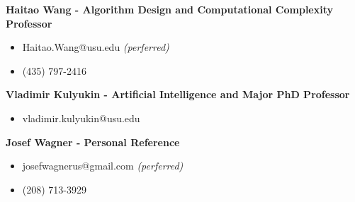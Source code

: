 \documentclass[letterpaper,11pt]{article}
\begin{document}
\textbf{Haitao Wang - Algorithm Design and Computational Complexity Professor}
\begin{itemize}[noitemsep,topsep=0pt]
	\item Haitao.Wang@usu.edu \textit{(perferred)}
	\item (435) 797-2416\\
\end{itemize}

\textbf{Vladimir Kulyukin - Artificial Intelligence and Major PhD Professor}
\begin{itemize}[noitemsep,topsep=0pt]
	\item vladimir.kulyukin@usu.edu\\
\end{itemize}

\textbf{Josef Wagner - Personal Reference}
\begin{itemize}[noitemsep,topsep=0pt]
	\item josefwagnerus@gmail.com \textit{(perferred)}
	\item (208) 713-3929
\end{itemize}


\end{document}
